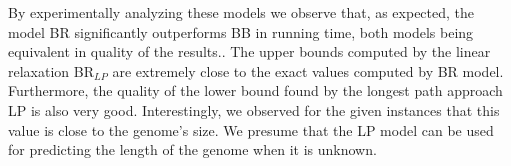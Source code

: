 {  %
By experimentally analyzing these models   
 we observe that, as expected, the model BR significantly outperforms BB in running time, both models being equivalent in quality of the results.. 
The upper bounds computed by the linear relaxation  BR$_{LP}$ are extremely close to the
exact values computed by BR model. Furthermore, the quality of the lower
bound found by the longest path approach LP is also very good. Interestingly,
we observed for the given instances that this value is close %
to the genome's size. We presume that the LP model can be used %
for predicting the length of the genome when it is unknown.

}
 
